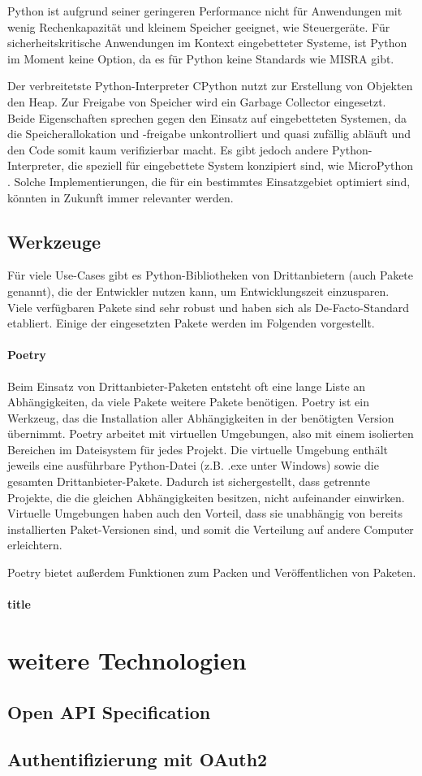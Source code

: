 		Python ist aufgrund seiner geringeren Performance nicht für Anwendungen mit wenig Rechenkapazität und kleinem Speicher geeignet, wie Steuergeräte. Für sicherheitskritische Anwendungen im Kontext eingebetteter Systeme, ist Python im Moment keine Option, da es für Python keine Standards wie MISRA gibt.
		
		Der verbreitetste Python-Interpreter CPython nutzt zur Erstellung von Objekten den Heap. Zur Freigabe von Speicher wird ein Garbage Collector eingesetzt. Beide Eigenschaften sprechen gegen den Einsatz auf eingebetteten Systemen, da die Speicherallokation und -freigabe unkontrolliert und quasi zufällig abläuft und den Code somit kaum verifizierbar macht. Es gibt jedoch andere Python-Interpreter, die speziell für eingebettete System konzipiert sind, wie MicroPython \cite[vgl.][]{george2018micropy}. Solche Implementierungen, die für ein bestimmtes Einsatzgebiet optimiert sind, könnten in Zukunft immer relevanter werden.
		
		
	\subsection{Werkzeuge}
		Für viele Use-Cases gibt es Python-Bibliotheken von Drittanbietern (auch Pakete genannt), die der Entwickler nutzen kann, um Entwicklungszeit einzusparen. Viele verfügbaren Pakete sind sehr robust und haben sich als De-Facto-Standard etabliert. Einige der eingesetzten Pakete werden im Folgenden vorgestellt.
		\paragraph{Poetry} Beim Einsatz von Drittanbieter-Paketen entsteht oft eine lange Liste an Abhängigkeiten, da viele Pakete weitere Pakete benötigen. Poetry ist ein Werkzeug, das die Installation aller Abhängigkeiten in der benötigten Version übernimmt. Poetry arbeitet mit virtuellen Umgebungen, also mit einem isolierten Bereichen im Dateisystem für jedes Projekt. Die virtuelle Umgebung enthält jeweils eine ausführbare Python-Datei (z.B. .exe unter Windows) sowie die gesamten Drittanbieter-Pakete. Dadurch ist sichergestellt, dass getrennte Projekte, die die gleichen Abhängigkeiten besitzen, nicht aufeinander einwirken. Virtuelle Umgebungen haben auch den Vorteil, dass sie unabhängig von bereits installierten Paket-Versionen sind, und somit die Verteilung auf andere Computer erleichtern.
		
		Poetry bietet außerdem Funktionen zum Packen und Veröffentlichen von Paketen.
		\paragraph{title}
	
\section{weitere Technologien}
	\subsection{Open API Specification}
	\subsection{Authentifizierung mit OAuth2}
	